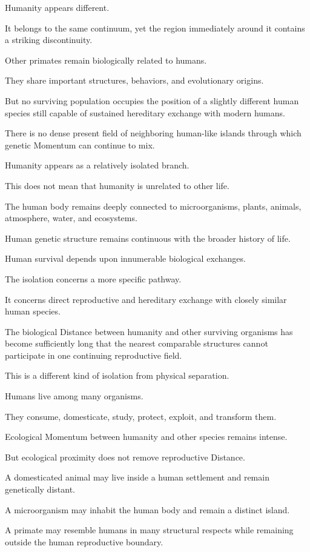 Humanity appears different.

It belongs to the same continuum, yet the region immediately around it contains a striking discontinuity.

Other primates remain biologically related to humans.

They share important structures, behaviors, and evolutionary origins.

But no surviving population occupies the position of a slightly different human species still capable of sustained hereditary exchange with modern humans.

There is no dense present field of neighboring human-like islands through which genetic Momentum can continue to mix.

Humanity appears as a relatively isolated branch.

This does not mean that humanity is unrelated to other life.

The human body remains deeply connected to microorganisms, plants, animals, atmosphere, water, and ecosystems.

Human genetic structure remains continuous with the broader history of life.

Human survival depends upon innumerable biological exchanges.

The isolation concerns a more specific pathway.

It concerns direct reproductive and hereditary exchange with closely similar human species.

The biological Distance between humanity and other surviving organisms has become sufficiently long that the nearest comparable structures cannot participate in one continuing reproductive field.

This is a different kind of isolation from physical separation.

Humans live among many organisms.

They consume, domesticate, study, protect, exploit, and transform them.

Ecological Momentum between humanity and other species remains intense.

But ecological proximity does not remove reproductive Distance.

A domesticated animal may live inside a human settlement and remain genetically distant.

A microorganism may inhabit the human body and remain a distinct island.

A primate may resemble humans in many structural respects while remaining outside the human reproductive boundary.

